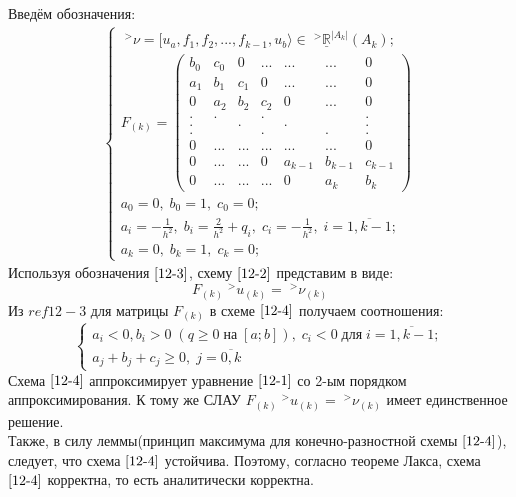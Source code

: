 \documentclass[__main__.tex]{subfiles}
\begin{document}
Введём обозначения:
\begin{gather}
\begin{cases}
\;^>\nu = [u_a,f_1,f_2,...,f_{k-1},u_b\rangle \in \;^>\underline{\mathbb{R}}^{|A_k|}(A_k);\\
F_{(k)}=
\begin{pmatrix}
b_0 & c_0 & 0 & ... & ... & ... & 0 \\
a_1 & b_1 & c_1 & 0 & ... & ... & 0\\
0 & a_2 & b_2 & c_2 & 0 & ... & 0\\
. & . & & . & & & .\\
. & & . & & . &  & .\\
. & & & . & & . & .\\
0 & ... & ... & ... & ... & ... & 0\\
0 & ... & ... & 0 & a_{k-1} & b_{k-1} & c_{k-1}\\
0 & ... & ... & ... & 0 & a_k & b_k
\end{pmatrix}\\
a_0=0, \; b_0=1, \; c_0=0;\\
a_i=-\frac{1}{h^2}, \; b_i=\frac{2}{h^2}+q_i, \; c_i=-\frac{1}{h^2},\; i=\overline{1,k-1};\\
a_k=0, \; b_k=1,\;c_k=0;
\end{cases}
\label{12-3}
\end{gather}
Используя обозначения $\ref{12-3}$, схему $\ref{12-2}$ представим в виде:\\
\begin{equation}
	F_{(k)}\;^>u_{(k)} = \;^>\nu_{(k)}
	\label{12-4}
\end{equation}
Из $ref{12-3}$ для матрицы $F_{(k)}$ в схеме $\ref{12-4}$ получаем соотношения:
\begin{equation}
	\begin{cases}
		a_i<0, b_i>0 \;(q\ge 0 \; \text{на} \; [a;b]), \; c_i < 0 \; \text{для} \; i=\overline{1,k-1};\\
		a_j+b_j+c_j \ge 0, \; j=\overline{0,k}
	\end{cases}
	\label{12-5}
\end{equation}
Схема $\ref{12-4}$  аппроксимирует уравнение $\ref{12-1}$ со 2-ым порядком аппроксимирования. К тому же СЛАУ $F_{(k)}\;^>u_{(k)} = \;^>\nu_{(k)}$ имеет единственное решение.\\
Также, в силу леммы(принцип максимума для конечно-разностной схемы $\ref{12-4}$), следует, что схема $\ref{12-4}$ устойчива. Поэтому, согласно теореме Лакса, схема $\ref*{12-4}$ корректна, то есть аналитически корректна.
\end{document}
